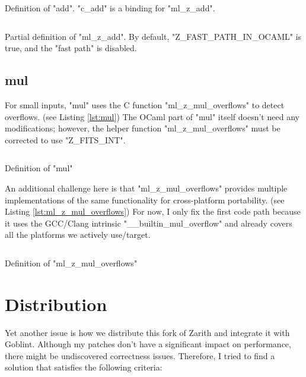 \documentclass{scrartcl}
\begin{document}
\begin{listing}[ht]
\inputminted[linenos, firstline=41, lastline=49]{ocaml}{z.ml}
\caption{Definition of "add". "c\_add" is a binding for "ml\_z\_add".}
\label{lst:add}
\end{listing}

\begin{listing}[ht]
\inputminted[linenos, firstline=1404, lastline=1414]{c}{caml_z.c}
\caption{Partial definition of "ml\_z\_add". By default, "Z\_FAST\_PATH\_IN\_OCAML" is true, and the "fast path" is disabled.}
\label{lst:ml_z_add}
\end{listing}

\subsection{mul}

For small inputs, "mul" uses the C function "ml\_z\_mul\_overflows" to detect overflows. (see Listing \ref{lst:mul}) The OCaml part of "mul" itself doesn't need any modifications; however, the helper function "ml\_z\_mul\_overflows" must be corrected to use "Z\_FITS\_INT".

\begin{listing}[ht]
\inputminted[linenos, firstline=67, lastline=71]{ocaml}{z.ml}
\caption{Definition of "mul"}
\label{lst:mul}
\end{listing}

An additional challenge here is that "ml\_z\_mul\_overflows" provides multiple implementations of the same functionality for cross-platform portability. (see Listing \ref{lst:ml_z_mul_overflows}) For now, I only fix the first code path because it uses the GCC/Clang intrinsic "\_\_builtin\_mul\_overflow" and already covers all the platforms we actively use/target.

\begin{listing}[ht]
\inputminted[linenos, firstline=1440, lastline=1470]{c}{caml_z.c}
\caption{Definition of "ml\_z\_mul\_overflows"}
\label{lst:ml_z_mul_overflows}
\end{listing}

\section{Distribution}

Yet another issue is how we distribute this fork of Zarith and integrate it with Goblint. Although my patches don't have a significant impact on performance, there might be undiscovered correctness issues. Therefore, I tried to find a solution that satisfies the following criteria:
\end{document}

